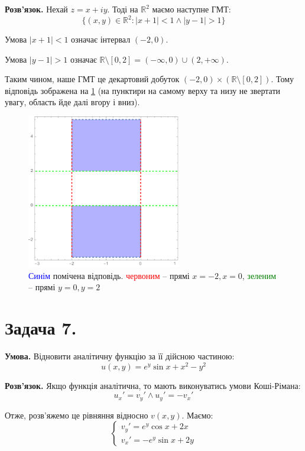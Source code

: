 \documentclass[14pt]{extarticle}
\begin{document}
\textbf{Розв'язок.} Нехай $z = x + iy$. Тоді на $\mathbb{R}^2$ маємо наступне ГМТ:
\[
\{(x,y)\in\mathbb{R}^2:|x+1| < 1 \wedge |y-1| > 1\}
\]

Умова $|x+1|<1$ означає інтервал $(-2,0)$. 

Умова $|y-1|>1$ означає $\mathbb{R} \setminus [0,2] = (-\infty,0) \cup (2,+\infty)$.

Таким чином, наше ГМТ це декартовий добуток $(-2,0) \times (\mathbb{R} \setminus [0,2])$. Тому відповідь зображена на \ref{fig:6} (на пунктири на самому верху та низу не звертати увагу, область йде далі вгору і вниз).

\begin{figure}[H]
    \centering
    \includegraphics[width=0.6\textwidth]{images/test_1/plot_2.png}
    \caption{\textcolor{blue}{Синім} помічена відповідь. \textcolor{red}{червоним} -- прямі $x=-2,x=0$, \textcolor{green}{зеленим} -- прямі $y=0,y=2$}
    \label{fig:6}
\end{figure}
\vspace{5px}

\pagebreak
\section*{Задача 7.}

\textbf{Умова.} Відновити аналітичну функцію за її дійсною частиною: 
\[
u(x,y) = e^y \sin x + x^2 - y^2
\]

\textbf{Розв'язок.} Якщо функція аналітична, то мають виконуватись умови Коші-Рімана:
\[
u_x' = v_y' \wedge u_y'=-v_x'
\]

Отже, розв'яжемо це рівняння відносно $v(x,y)$. Маємо:
\[
\begin{cases}
    v_y' = e^y \cos x + 2x \\
    v_x' = -e^y\sin x + 2y
\end{cases}
\]
\end{document}
